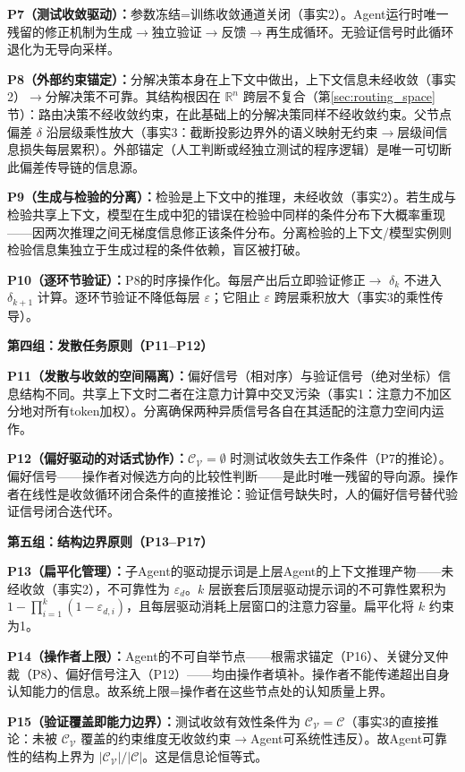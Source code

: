 \documentclass[11pt,a4paper]{article}
\theoremstyle{definition}
\newcommand{\verifspace}{\mathcal{C}_{\mathcal{V}}}
\newcommand{\taskcspace}{\mathcal{C}}
\begin{document}
\textbf{P7（测试收敛驱动）：}参数冻结=训练收敛通道关闭（事实2）。Agent运行时唯一残留的修正机制为生成$\to$独立验证$\to$反馈$\to$再生成循环。无验证信号时此循环退化为无导向采样。

\textbf{P8（外部约束锚定）：}分解决策本身在上下文中做出，上下文信息未经收敛（事实2）$\to$分解决策不可靠。其结构根因在 $\mathbb{R}^n$ 跨层不复合（第\ref{sec:routing_space}节）：路由决策不经收敛约束，在此基础上的分解决策同样不经收敛约束。父节点偏差 $\delta$ 沿层级乘性放大（事实3：截断投影边界外的语义映射无约束$\to$层级间信息损失每层累积）。外部锚定（人工判断或经独立测试的程序逻辑）是唯一可切断此偏差传导链的信息源。

\textbf{P9（生成与检验的分离）：}检验是上下文中的推理，未经收敛（事实2）。若生成与检验共享上下文，模型在生成中犯的错误在检验中同样的条件分布下大概率重现——因两次推理之间无梯度信息修正该条件分布。分离检验的上下文/模型实例则检验信息集独立于生成过程的条件依赖，盲区被打破。

\textbf{P10（逐环节验证）：}P8的时序操作化。每层产出后立即验证修正$\to$ $\delta_k$ 不进入 $\delta_{k+1}$ 计算。逐环节验证不降低每层 $\varepsilon$；它阻止 $\varepsilon$ 跨层乘积放大（事实3的乘性传导）。

\medskip
\textbf{第四组：发散任务原则（P11--P12）}

\textbf{P11（发散与收敛的空间隔离）：}偏好信号（相对序）与验证信号（绝对坐标）信息结构不同。共享上下文时二者在注意力计算中交叉污染（事实1：注意力不加区分地对所有token加权）。分离确保两种异质信号各自在其适配的注意力空间内运作。

\textbf{P12（偏好驱动的对话式协作）：}$\verifspace = \emptyset$ 时测试收敛失去工作条件（P7的推论）。偏好信号——操作者对候选方向的比较性判断——是此时唯一残留的导向源。操作者在线性是收敛循环闭合条件的直接推论：验证信号缺失时，人的偏好信号替代验证信号闭合迭代环。

\medskip
\textbf{第五组：结构边界原则（P13--P17）}

\textbf{P13（扁平化管理）：}子Agent的驱动提示词是上层Agent的上下文推理产物——未经收敛（事实2），不可靠性为 $\varepsilon_d$。$k$ 层嵌套后顶层驱动提示词的不可靠性累积为 $1 - \prod_{i=1}^k (1-\varepsilon_{d,i})$，且每层驱动消耗上层窗口的注意力容量。扁平化将 $k$ 约束为1。

\textbf{P14（操作者上限）：}Agent的不可自举节点——根需求锚定（P16）、关键分叉仲裁（P8）、偏好信号注入（P12）——均由操作者填补。操作者不能传递超出自身认知能力的信息。故系统上限=操作者在这些节点处的认知质量上界。

\textbf{P15（验证覆盖即能力边界）：}测试收敛有效性条件为 $\verifspace = \taskcspace$（事实3的直接推论：未被 $\verifspace$ 覆盖的约束维度无收敛约束$\to$Agent可系统性违反）。故Agent可靠性的结构上界为 $|\verifspace|/|\taskcspace|$。这是信息论恒等式。
\end{document}
